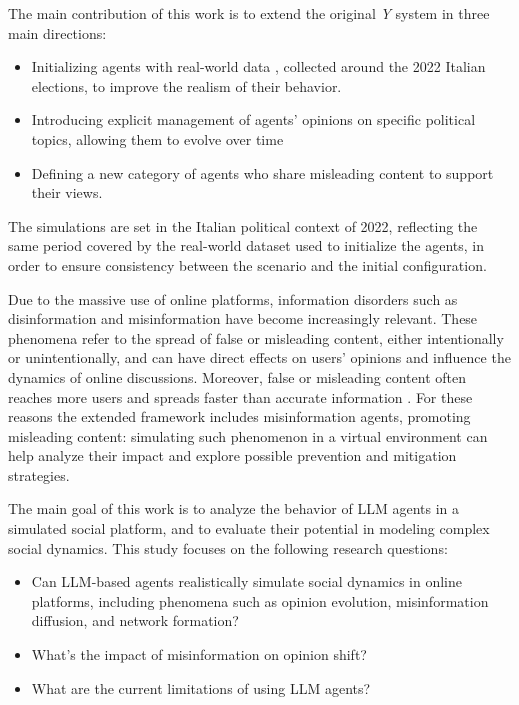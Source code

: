 The main contribution of this work is to extend the original \textit{Y} system in three main directions:
\begin{itemize}
    \item Initializing agents with real-world data \cite{pierri2023ita}, collected around the 2022 Italian elections, to improve the realism of their behavior.
    \item Introducing explicit management of agents' opinions on specific political topics, allowing them to evolve over time
    \item Defining a new category of agents who share misleading content to support their views.
\end{itemize}

\medskip
The simulations are set in the Italian political context of 2022, reflecting the same period covered by the real-world dataset used to initialize the agents, in order to ensure consistency between the scenario and the initial configuration.

\medskip
Due to the massive use of online platforms, information disorders such as disinformation and misinformation have become increasingly relevant.
These phenomena refer to the spread of false or misleading content, either intentionally or unintentionally, and can have direct effects on users' opinions and influence the dynamics of online discussions.
Moreover, false or misleading content often reaches more users and spreads faster than accurate information \cite{kumar2018falseinformationwebsocial}.
For these reasons the extended framework includes misinformation agents, promoting misleading content: simulating such phenomenon in a virtual environment can help analyze their impact and explore possible prevention and mitigation strategies.

\medskip
The main goal of this work is to analyze the behavior of LLM agents in a simulated social platform, and to evaluate their potential in modeling complex social dynamics.
This study focuses on the following research questions:
\begin{itemize}
    \item Can LLM-based agents realistically simulate social dynamics in online platforms, including phenomena such as opinion evolution, misinformation diffusion, and network formation?
    \item What's the impact of misinformation on opinion shift?
    \item What are the current limitations of using LLM agents?
\end{itemize}

